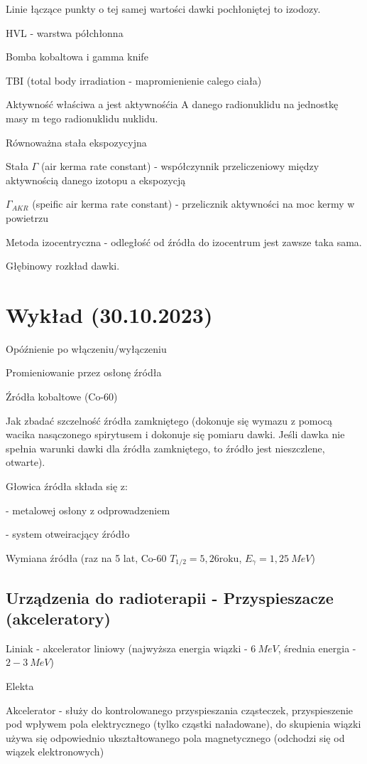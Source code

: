 \documentclass{article}
\begin{document}
Linie łączące punkty o tej samej wartości dawki pochłoniętej to izodozy.

HVL - warstwa półchłonna

Bomba kobaltowa i gamma knife

TBI (total body irradiation - mapromienienie calego ciała)

Aktywność właściwa a jest aktywnośćia A danego radionuklidu na jednostkę masy m tego radionuklidu nuklidu.

Równoważna stała ekspozycyjna

Stała $\Gamma$ (air kerma rate constant) - współczynnik przeliczeniowy między aktywnością danego izotopu a ekspozycją

$\Gamma_{AKR}$ (speific air kerma rate constant) - przelicznik aktywności na moc kermy w powietrzu

Metoda izocentryczna - odległość od źródła do izocentrum jest zawsze taka sama.

Głębinowy rozkład dawki.

\section{Wykład (30.10.2023)}

Opóźnienie po włączeniu\slash wyłączeniu

Promieniowanie przez osłonę źródła

Źródła kobaltowe (Co-60)

Jak zbadać szczelność źródła zamkniętego (dokonuje się wymazu z pomocą wacika nasączonego spirytusem i dokonuje się pomiaru dawki. Jeśli dawka nie spełnia warunki dawki dla źródła zamkniętego, to źródło jest nieszczlene, otwarte).

Głowica źródła składa się z:

- metalowej osłony z odprowadzeniem

- system otweiracjący źródło

Wymiana źródła (raz na 5 lat, Co-60 $T_{1/2} = 5,26 \mathrm{roku}$, $E_{\gamma} = 1,25~MeV$)

\subsection{Urządzenia do radioterapii - Przyspieszacze (akceleratory)}

Liniak - akcelerator liniowy (najwyższa energia wiązki - $6~MeV$, średnia energia - $2-3~MeV$)

Elekta

Akcelerator - służy do kontrolowanego przyspieszania cząsteczek, przyspieszenie pod wpływem pola elektrycznego (tylko cząstki naładowane), do skupienia wiązki używa się odpowiednio ukształtowanego pola magnetycznego (odchodzi się od wiązek elektronowych)
\end{document}
